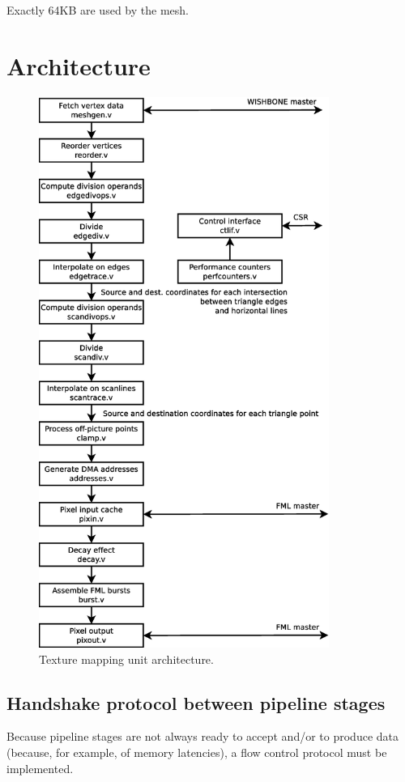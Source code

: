 \documentclass[a4paper,11pt]{article}
\begin{document}
Exactly 64KB are used by the mesh.

\section{Architecture}

\begin{figure}[H]
\centering
\includegraphics[height=180mm]{architecture.eps}
\caption{Texture mapping unit architecture.}\label{fig:architecture}
\end{figure}

\subsection{Handshake protocol between pipeline stages}
Because pipeline stages are not always ready to accept and/or to produce data (because, for example, of memory latencies), a flow control protocol must be implemented.
\end{document}
